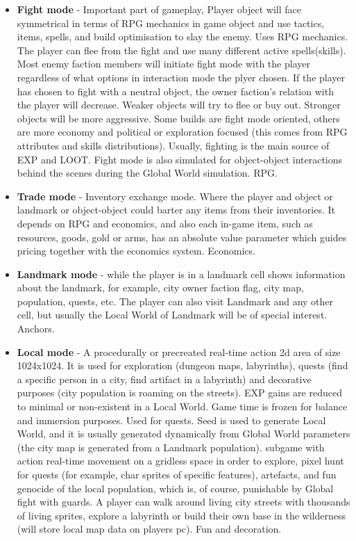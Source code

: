 \documentclass[a4paper,12pt]{article}
\begin{document}
\begin{itemize}
 \item \textbf{Fight mode} - Important part of gameplay, Player object will face symmetrical in terms of RPG mechanics in game object and use tactics, items, spells, and build optimisation to slay the enemy. Uses RPG mechanics. The player can flee from the fight and use many different active spells(skills). Most enemy faction members will initiate fight mode with the player regardless of what options in interaction mode the plyer chosen. If the player has chosen to fight with a neutral object, the owner faction's relation with the player will decrease. Weaker objects will try to flee or buy out. Stronger objects will be more aggressive. Some builds are fight mode oriented, others are more economy and political or exploration focused (this comes from RPG attributes and skills distributions). Usually, fighting is the main source of EXP and LOOT. Fight mode is also simulated for object-object interactions behind the scenes during the Global World simulation. RPG.
 
 \item \textbf{Trade mode} - Inventory exchange mode. Where the player and object or landmark or object-object could barter any items from their inventories. It depends on RPG and economics, and also each in-game item, such as resources, goods, gold or arms, has an absolute value parameter which guides pricing together with the economics system. Economics.
 
 \item \textbf{Landmark mode} - while the player is in a landmark cell shows information about the landmark, for example, city owner faction flag, city map, population, quests, etc. The player can also visit Landmark and any other cell, but usually the Local World of Landmark will be of special interest. Anchors. 
 
 \item \textbf{Local mode} - A procedurally or precreated real-time action 2d area of size 1024x1024. It is used for exploration (dungeon maps, labyrinths), quests (find a specific person in a city, find artifact in a labyrinth) and decorative purposes (city population is roaming on the streets). EXP gains are reduced to minimal or non-existent in a Local World. Game time is frozen for balance and immersion purposes. Used for quests. Seed is used to generate Local World, and it is usually generated dynamically from Global World parameters (the city map is generated from a Landmark population).
 subgame with action real-time movement on a gridless space in order to explore, pixel hunt for quests (for example, char sprites of specific features), artefacts, and fun genocide of the local population, which is, of course, punishable by Global fight with guards. A player can walk around living city streets with thousands of living sprites, explore a labyrinth or build their own base in the wilderness (will store local map data on players pc).  Fun and decoration.
 

\end{itemize}
\end{document}
